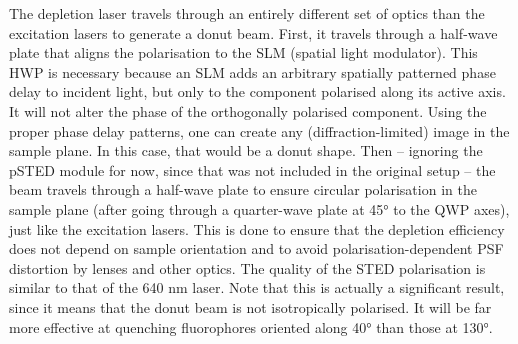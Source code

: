 The depletion laser travels through an entirely different set of optics than the excitation lasers to generate a donut beam. First, it travels through a half-wave plate that aligns the polarisation to the SLM (spatial light modulator). This HWP is necessary because an SLM adds an arbitrary spatially patterned phase delay to incident light, but only to the component polarised along its active axis. It will not alter the phase of the orthogonally polarised component. Using the proper phase delay patterns, one can create any (diffraction-limited) image in the sample plane. In this case, that would be a donut shape. Then -- ignoring the pSTED module for now, since that was not included in the original setup -- the beam travels through a half-wave plate to ensure circular polarisation in the sample plane (after going through a quarter-wave plate at \ang{45} to the QWP axes), just like the excitation lasers. This is done to ensure that the depletion efficiency does not depend on sample orientation and to avoid polarisation-dependent PSF distortion by lenses and other optics. The quality of the STED polarisation is similar to that of the 640 nm laser. Note that this is actually a significant result, since it means that the donut beam is not isotropically polarised. It will be far more effective at quenching fluorophores oriented along \ang{40} than those at \ang{130}.

